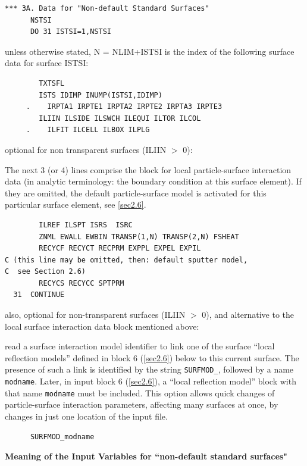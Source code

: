 \begin{lstlisting}
*** 3A. Data for "Non-default Standard Surfaces"
      NSTSI
      DO 31 ISTSI=1,NSTSI
\end{lstlisting}

unless otherwise stated, N = NLIM+ISTSI is the index of the following
surface data for surface ISTSI:

\begin{lstlisting}
        TXTSFL
        ISTS IDIMP INUMP(ISTSI,IDIMP)
     .    IRPTA1 IRPTE1 IRPTA2 IRPTE2 IRPTA3 IRPTE3
        ILIIN ILSIDE ILSWCH ILEQUI ILTOR ILCOL
     .    ILFIT ILCELL ILBOX ILPLG
\end{lstlisting}

optional for non transparent surfaces (ILIIN $>$ 0):

The next 3 (or 4) lines comprise the block for local particle-surface
interaction data (in analytic terminology: the boundary condition at this
surface element).
If they are omitted, the default particle-surface model is activated for this
particular surface element, see \cref{sec2.6}.

\begin{lstlisting}
        ILREF ILSPT ISRS  ISRC
        ZNML EWALL EWBIN TRANSP(1,N) TRANSP(2,N) FSHEAT
        RECYCF RECYCT RECPRM EXPPL EXPEL EXPIL
C (this line may be omitted, then: default sputter model, 
C  see Section 2.6)
        RECYCS RECYCC SPTPRM
  31  CONTINUE
\end{lstlisting}

also, optional for non-transparent surfaces (ILIIN $>$ 0), and
alternative to the local surface interaction data block mentioned
above:

read a surface interaction model identifier to link one of the surface
``local reflection
models'' defined in block 6 (\cref{sec2.6}) below to this current surface.
The presence of such a link is identified by the string \lstinline|SURFMOD_|,
followed by a name \lstinline|modname|.
Later, in input block 6 (\cref{sec2.6}), a ``local reflection model'' block
with that name \lstinline|modname| must be included.
This option allows quick changes of particle-surface interaction parameters,
affecting many surfaces at once, by changes in just one location of the input
file.

\begin{lstlisting}
      SURFMOD_modname
\end{lstlisting}

\medskip

\textbf{Meaning of the Input Variables for ``non-default standard surfaces"}


